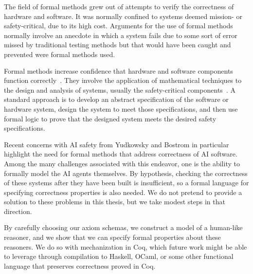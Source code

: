 
The field of formal methods grew out of attempts to verify the correctness of hardware and software. It was normally confined to systems deemed mission- or safety-critical, due to its high cost. Arguments for the use of formal methods normally involve an anecdote in which a system fails due to some sort of error missed by traditional testing methods but that would have been caught and prevented were formal methods used.

Formal methods increase confidence that hardware and software components function correctly~\cite{RushbyFMbook}. They involve the application of mathematical techniques to the design and analysis of systems, usually the safety-critical components~\cite{johnson_butler_fm}. A standard approach is to develop an abstract specification of the software or hardware system, design the system to meet those specifications, and then use formal logic to prove that the designed system meets the desired safety specifications.

Recent concerns with AI safety from Yudkowsky \cite{yudkowski} and Bostrom \cite{bostrom} in particular highlight the need for formal methods that address correctness of AI software. Among the many challenges associated with this endeavor, one is the ability to formally model the AI agents themselves. By hypothesis, checking the correctness of these systems after they have been built is insufficient, so a formal language for specifying correctness properties is also needed. We do not pretend to provide a solution to these problems in this thesis, but we take modest steps in that direction.

By carefully choosing our axiom schemas, we construct a model of a human-like reasoner, and we show that we can specify formal properties about these reasoners. We do so with mechanization in Coq, which future work might be able to leverage through compilation to Haskell, OCaml, or some other functional language that preserves correctness proved in Coq.

